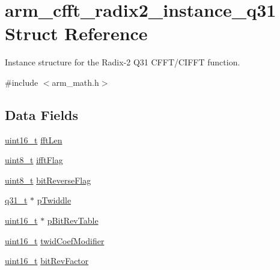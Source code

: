 \hypertarget{structarm__cfft__radix2__instance__q31}{\section{arm\-\_\-cfft\-\_\-radix2\-\_\-instance\-\_\-q31 Struct Reference}
\label{structarm__cfft__radix2__instance__q31}
}


Instance structure for the Radix-\/2 Q31 C\-F\-F\-T/\-C\-I\-F\-F\-T function.  




{\ttfamily \#include $<$arm\-\_\-math.\-h$>$}

\subsection*{Data Fields}
\begin{DoxyCompactItemize}
\item 
\hyperlink{stdint_8h_a273cf69d639a59973b6019625df33e30}{uint16\-\_\-t} \hyperlink{structarm__cfft__radix2__instance__q31_a960199f1373a192366878ef279eab00f}{fft\-Len}
\item 
\hyperlink{stdint_8h_aba7bc1797add20fe3efdf37ced1182c5}{uint8\-\_\-t} \hyperlink{structarm__cfft__radix2__instance__q31_a2607378ce64be16698bb8a3b1af8d3c8}{ifft\-Flag}
\item 
\hyperlink{stdint_8h_aba7bc1797add20fe3efdf37ced1182c5}{uint8\-\_\-t} \hyperlink{structarm__cfft__radix2__instance__q31_a6239b8d268285334e88c008c07d68616}{bit\-Reverse\-Flag}
\item 
\hyperlink{arm__math_8h_adc89a3547f5324b7b3b95adec3806bc0}{q31\-\_\-t} $\ast$ \hyperlink{structarm__cfft__radix2__instance__q31_a1d5bbe9a991e133f81652a77a7985d23}{p\-Twiddle}
\item 
\hyperlink{stdint_8h_a273cf69d639a59973b6019625df33e30}{uint16\-\_\-t} $\ast$ \hyperlink{structarm__cfft__radix2__instance__q31_ada8e5264f4b22ff4c621817978994674}{p\-Bit\-Rev\-Table}
\item 
\hyperlink{stdint_8h_a273cf69d639a59973b6019625df33e30}{uint16\-\_\-t} \hyperlink{structarm__cfft__radix2__instance__q31_ae63ca9193322cd477970c1d2086407d1}{twid\-Coef\-Modifier}
\item 
\hyperlink{stdint_8h_a273cf69d639a59973b6019625df33e30}{uint16\-\_\-t} \hyperlink{structarm__cfft__radix2__instance__q31_a9d17a87263953fe3559a007512c9f3a4}{bit\-Rev\-Factor}
\end{DoxyCompactItemize}


